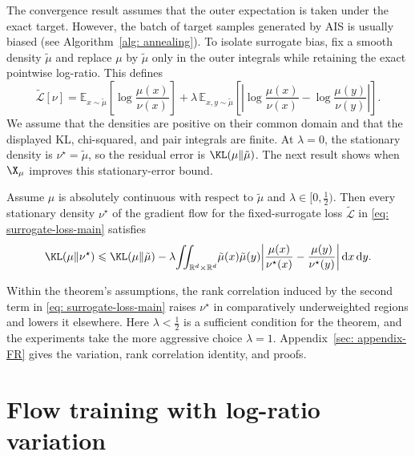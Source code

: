 \documentclass{article}
\begin{document}
The convergence result assumes that the outer expectation is taken under the exact target. However, the batch of target samples generated by AIS is usually biased (see Algorithm~\ref{alg: annealing}). To isolate surrogate bias, fix a smooth density $\tilde\mu$ and replace $\mu$ by $\tilde\mu$ only in the outer integrals while retaining the exact pointwise log-ratio. This defines
\begin{equation}
\widetilde{\mathcal L}[\nu]
=\mathbb E_{x\sim\tilde\mu}\!\left[\log\frac{\mu(x)}{\nu(x)}\right]
+\lambda\,\mathbb E_{x,y\sim\tilde\mu}\!\left[\left|\log\frac{\mu(x)}{\nu(x)}-\log\frac{\mu(y)}{\nu(y)}\right|\right].
\label{eq: surrogate-loss-main}
\end{equation}
We assume that the densities are positive on their common domain and that the displayed KL, chi-squared, and pair integrals are finite. At $\lambda=0$, the stationary density is $\nu^\star=\tilde\mu$, so the residual error is $\KL(\mu\|\tilde\mu)$. The next result shows when $\X_\mu$ improves this stationary-error bound.
\begin{theorem}
\label{thm: accuracy}
Assume $\mu$ is absolutely continuous with respect to $\tilde\mu$ and $\lambda \in [0, \tfrac12)$. Then every stationary density $\nu^\star$ of the gradient flow for the fixed-surrogate loss $\widetilde{\mathcal L}$ in \eqref{eq: surrogate-loss-main} satisfies
\begin{equation}
    \KL(\mu\|\nu^\star) \Le \KL(\mu\|\tilde\mu) - \lambda\!\iint_{\mathbb R^d\times\mathbb R^d}\!\tilde\mu(x)\tilde\mu(y) \biggl|\frac{\mu(x)}{\nu^\star(x)} - \frac{\mu(y)}{\nu^\star(y)}\biggr| \D x \D y.
    \label{eq: accuracy-bound}
\end{equation}
\end{theorem}
\noindent Within the theorem's assumptions, the rank correlation induced by the second term in \eqref{eq: surrogate-loss-main} raises $\nu^\star$ in comparatively underweighted regions and lowers it elsewhere. Here $\lambda<\tfrac12$ is a sufficient condition for the theorem, and the experiments take the more aggressive choice $\lambda=1$. Appendix~\ref{sec: appendix-FR} gives the variation, rank correlation identity, and proofs.

\section{Flow training with log-ratio variation}
\label{sec: training}
\end{document}
